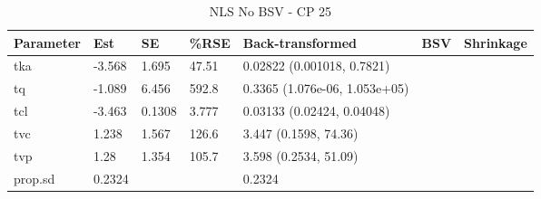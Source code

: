 \begin{table}
\centering\centering
\caption{NLS No BSV - CP 25}
\centering
\fontsize{8}{10}\selectfont
\begin{tabular}[t]{lllllll}
\toprule
\textbf{Parameter} & \textbf{Est} & \textbf{SE} & \textbf{\%RSE} & \textbf{Back-transformed} & \textbf{BSV} & \textbf{Shrinkage}\\
\midrule
tka & -3.568 & 1.695 & 47.51 & 0.02822 (0.001018, 0.7821) &  & \\
\midrule
tq & -1.089 & 6.456 & 592.8 & 0.3365 (1.076e-06, 1.053e+05) &  & \\
\midrule
tcl & -3.463 & 0.1308 & 3.777 & 0.03133 (0.02424, 0.04048) &  & \\
\midrule
tvc & 1.238 & 1.567 & 126.6 & 3.447 (0.1598, 74.36) &  & \\
\midrule
tvp & 1.28 & 1.354 & 105.7 & 3.598 (0.2534, 51.09) &  & \\
\midrule
prop.sd & 0.2324 &  &  & 0.2324 &  & \\
\bottomrule
\end{tabular}
\end{table}